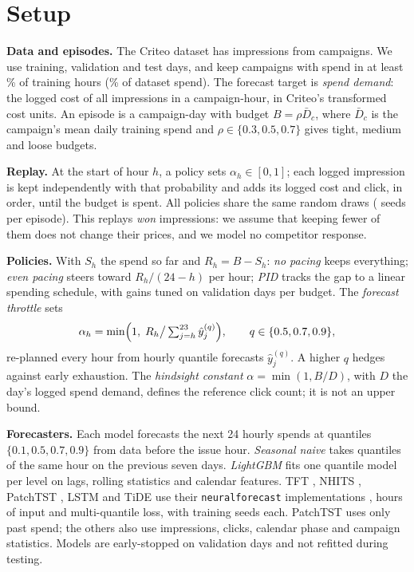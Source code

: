 \documentclass[sigconf,nonacm]{acmart}
\begin{document}
\section{Setup}\label{sec:setup}

\textbf{Data and episodes.} The Criteo dataset has 
impressions from  campaigns. We use
 training,  validation and
 test days, and keep  campaigns with
spend in at least \% of training hours
(\% of dataset spend). The forecast target is
\emph{spend demand}: the logged cost of all impressions in a campaign-hour,
in Criteo's transformed cost units. An episode is a campaign-day with budget
$B=\rho\bar D_c$, where $\bar D_c$ is the campaign's mean daily training spend
and $\rho\in\{0.3,0.5,0.7\}$ gives tight, medium and loose budgets.

\textbf{Replay.} At the start of hour $h$, a policy sets $\alpha_h\in[0,1]$;
each logged impression is kept independently with that probability and adds
its logged cost and click, in order, until the budget is spent. All policies
share the same random draws ( seeds per episode). This
replays \emph{won} impressions: we assume that keeping fewer of them does not
change their prices, and we model no competitor response.

\textbf{Policies.} With $S_h$ the spend so far and $R_h=B-S_h$:
\emph{no pacing} keeps everything; \emph{even pacing} steers toward
$R_h/(24-h)$ per hour; \emph{PID} tracks the gap to a linear spending
schedule, with gains tuned on validation days per budget. The
\emph{forecast throttle} sets
\begin{equation}
  \alpha_h = \min\Bigl(1,\; R_h \big/ \textstyle\sum_{j=h}^{23} \hat{y}^{(q)}_j\Bigr),
  \qquad q \in \{0.5, 0.7, 0.9\},
  \label{eq:throttle}
\end{equation}
re-planned every hour from hourly quantile forecasts $\hat y^{(q)}_j$. A
higher $q$ hedges against early exhaustion. The \emph{hindsight constant}
$\alpha=\min(1,B/D)$, with $D$ the day's logged spend demand, defines the
reference click count; it is not an upper bound.

\textbf{Forecasters.} Each model forecasts the next 24 hourly spends at
quantiles $\{0.1,0.5,0.7,0.9\}$ from data before the issue hour.
\emph{Seasonal naive} takes quantiles of the same hour on the previous seven
days. \emph{LightGBM} \cite{ke2017lightgbm} fits one quantile model per level
on lags, rolling statistics and calendar features. TFT \cite{lim2021temporal},
NHITS \cite{challu2023nhits}, PatchTST \cite{nie2023patchtst}, LSTM
\cite{hochreiter1997lstm} and TiDE \cite{das2023tide} use their
\texttt{neuralforecast} implementations \cite{olivares2022neuralforecast},
 hours of input and multi-quantile loss, with
 training seeds each. PatchTST uses only past spend; the
others also use impressions, clicks, calendar phase and campaign statistics.
Models are early-stopped on validation days and not refitted during testing.
\end{document}
